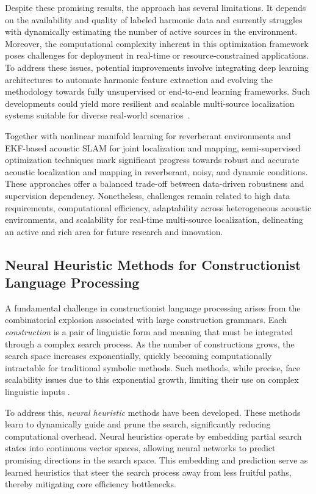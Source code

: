 \documentclass[sigconf]{acmart}
\begin{document}
Despite these promising results, the approach has several limitations. It depends on the availability and quality of labeled harmonic data and currently struggles with dynamically estimating the number of active sources in the environment. Moreover, the computational complexity inherent in this optimization framework poses challenges for deployment in real-time or resource-constrained applications. To address these issues, potential improvements involve integrating deep learning architectures to automate harmonic feature extraction and evolving the methodology towards fully unsupervised or end-to-end learning frameworks. Such developments could yield more resilient and scalable multi-source localization systems suitable for diverse real-world scenarios~\cite{ref52}.

Together with nonlinear manifold learning for reverberant environments and EKF-based acoustic SLAM for joint localization and mapping, semi-supervised optimization techniques mark significant progress towards robust and accurate acoustic localization and mapping in reverberant, noisy, and dynamic conditions. These approaches offer a balanced trade-off between data-driven robustness and supervision dependency. Nonetheless, challenges remain related to high data requirements, computational efficiency, adaptability across heterogeneous acoustic environments, and scalability for real-time multi-source localization, delineating an active and rich area for future research and innovation.

\subsection{Neural Heuristic Methods for Constructionist Language Processing}

A fundamental challenge in constructionist language processing arises from the combinatorial explosion associated with large construction grammars. Each \emph{construction} is a pair of linguistic form and meaning that must be integrated through a complex search process. As the number of constructions grows, the search space increases exponentially, quickly becoming computationally intractable for traditional symbolic methods. Such methods, while precise, face scalability issues due to this exponential growth, limiting their use on complex linguistic inputs \cite{ref40}.

To address this, \emph{neural heuristic} methods have been developed. These methods learn to dynamically guide and prune the search, significantly reducing computational overhead. Neural heuristics operate by embedding partial search states into continuous vector spaces, allowing neural networks to predict promising directions in the search space. This embedding and prediction serve as learned heuristics that steer the search process away from less fruitful paths, thereby mitigating core efficiency bottlenecks.
\end{document}
